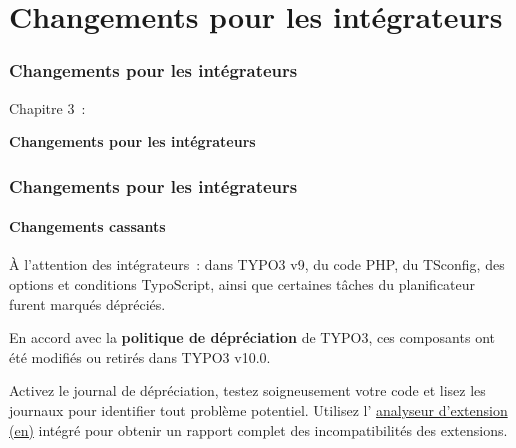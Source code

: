 %

\section{Changements pour les intégrateurs}
\begin{frame}[fragile]
	\frametitle{Changements pour les intégrateurs}

	\begin{center}\huge{Chapitre 3~:}\end{center}
	\begin{center}\huge{\color{typo3darkgrey}\textbf{Changements pour les intégrateurs}}\end{center}

\end{frame}


\begin{frame}[fragile]
	\frametitle{Changements pour les intégrateurs}
	\framesubtitle{Changements cassants}

	\small
		À l'attention des intégrateurs~: dans TYPO3 v9, du code PHP, du TSconfig, des options et conditions TypoScript,
		ainsi que certaines tâches du planificateur furent marqués dépréciés.

		\vspace{0.2cm}

		En accord avec la \textbf{politique de dépréciation} de TYPO3, ces composants ont été modifiés ou
		retirés dans TYPO3 v10.0.

		\vspace{0.2cm}

		Activez le journal de dépréciation, testez soigneusement votre code et lisez les journaux pour identifier
		tout problème potentiel. Utilisez l'
		\href{https://docs.typo3.org/m/typo3/reference-coreapi/master/en-us/ApiOverview/ExtensionScanner/Index.html}{analyseur d'extension (en)}
		intégré pour obtenir un rapport complet des incompatibilités des extensions.

	\normalsize

\end{frame}

